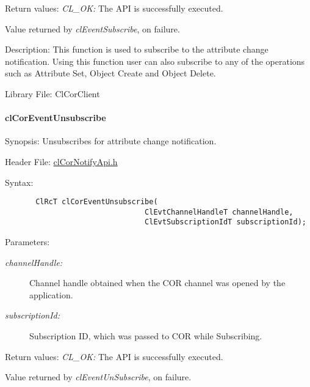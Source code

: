 \begin{Desc}
\item[Return values:]{\em CL\_\-OK:\/} The API is successfully executed. \par
 Value returned by {\em cl\-Event\-Subscribe\/}, on failure.\end{Desc}
\begin{Desc}
\item[Description:]This function is used to subscribe to the attribute change notification. Using this function user can also subscribe to any of the operations such as Attribute Set, Object Create and Object Delete.\end{Desc}
\begin{Desc}
\item[Library File:]Cl\-Cor\-Client \end{Desc}
\hypertarget{pagecor302}{}\paragraph{cl\-Cor\-Event\-Unsubscribe}\label{pagecor302}
\begin{Desc}
\item[Synopsis:]Unsubscribes for attribute change notification.\end{Desc}
\begin{Desc}
\item[Header File:]\hyperlink{cl_cor_notify_api_8h}{cl\-Cor\-Notify\-Api.h}\end{Desc}
\begin{Desc}
\item[Syntax:]

\footnotesize\begin{verbatim}       ClRcT clCorEventUnsubscribe(
                                ClEvtChannelHandleT channelHandle, 
                                ClEvtSubscriptionIdT subscriptionId); 
\end{verbatim}
\normalsize
\end{Desc}
\begin{Desc}
\item[Parameters:]
\begin{description}
\item[{\em channel\-Handle:}]Channel handle obtained when the COR channel was opened by the application. \item[{\em subscription\-Id:}]Subscription ID, which was passed to COR while Subscribing.\end{description}
\end{Desc}
\begin{Desc}
\item[Return values:]{\em CL\_\-OK:\/} The API is successfully executed. \par
 Value returned by {\em cl\-Event\-Un\-Subscribe\/}, on failure.\end{Desc}

